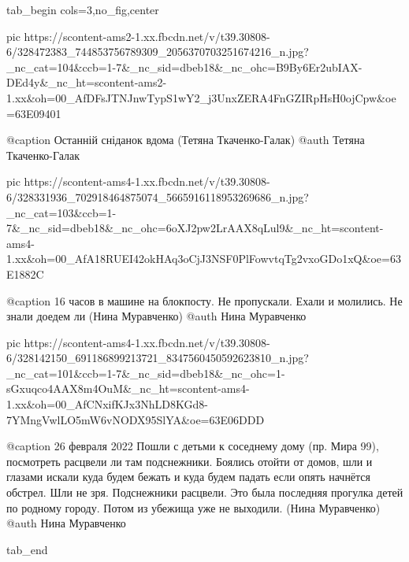  
 
 
 
 

\clearpage
{}

\ifcmt
  tab_begin cols=3,no_fig,center

     pic https://scontent-ams2-1.xx.fbcdn.net/v/t39.30808-6/328472383_744853756789309_2056370703251674216_n.jpg?_nc_cat=104&ccb=1-7&_nc_sid=dbeb18&_nc_ohc=B9By6Er2ubIAX-DEd4y&_nc_ht=scontent-ams2-1.xx&oh=00_AfDFsJTNJnwTypS1wY2_j3UnxZERA4FnGZIRpHsH0ojCpw&oe=63E09401

     @caption Останній сніданок вдома (Тетяна Ткаченко-Галак)
     @auth Тетяна Ткаченко-Галак

     pic https://scontent-ams4-1.xx.fbcdn.net/v/t39.30808-6/328331936_702918464875074_5665916118953269686_n.jpg?_nc_cat=103&ccb=1-7&_nc_sid=dbeb18&_nc_ohc=6oXJ2pw2LrAAX8qLul9&_nc_ht=scontent-ams4-1.xx&oh=00_AfA18RUEI42okHAq3oCjJ3NSF0PlFowvtqTg2vxoGDo1xQ&oe=63E1882C

     @caption 16 часов в машине на блокпосту. Не пропускали. Ехали и молились. Не знали доедем ли (Нина Муравченко)
     @auth Нина Муравченко

     pic https://scontent-ams4-1.xx.fbcdn.net/v/t39.30808-6/328142150_691186899213721_8347560450592623810_n.jpg?_nc_cat=101&ccb=1-7&_nc_sid=dbeb18&_nc_ohc=1-sGxuqco4AAX8m4OuM&_nc_ht=scontent-ams4-1.xx&oh=00_AfCNxifKJx3NhLD8KGd8-7YMngVwlLO5mW6vNODX95SlYA&oe=63E06DDD

     @caption 26 февраля 2022 Пошли с детьми к соседнему дому (пр. Мира 99), посмотреть расцвели ли там подснежники. Боялись отойти от домов, шли и глазами искали куда будем бежать и куда будем падать если опять начнётся обстрел. Шли не зря. Подснежники расцвели. Это была последняя прогулка детей по родному городу. Потом из убежища уже не выходили. (Нина Муравченко)
     @auth Нина Муравченко

  tab_end
\fi
